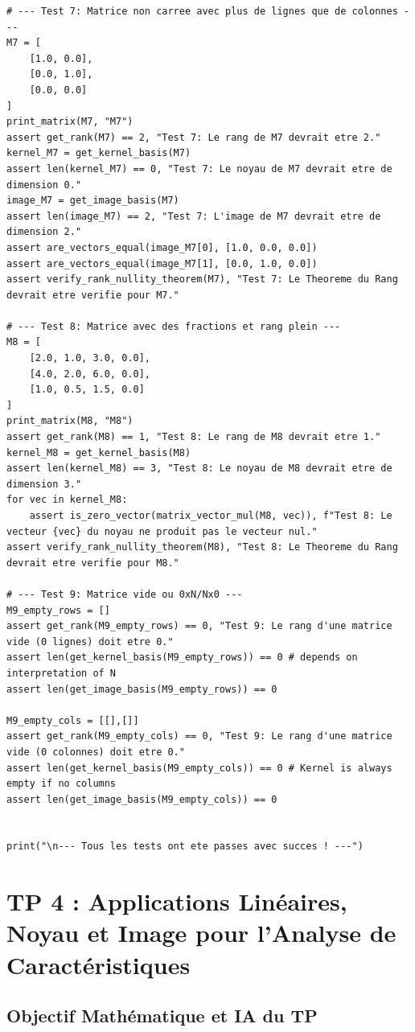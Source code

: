 \documentclass{report}
\begin{document}
\begin{verbatim}
# --- Test 7: Matrice non carree avec plus de lignes que de colonnes ---
M7 = [
    [1.0, 0.0],
    [0.0, 1.0],
    [0.0, 0.0]
]
print_matrix(M7, "M7")
assert get_rank(M7) == 2, "Test 7: Le rang de M7 devrait etre 2."
kernel_M7 = get_kernel_basis(M7)
assert len(kernel_M7) == 0, "Test 7: Le noyau de M7 devrait etre de dimension 0."
image_M7 = get_image_basis(M7)
assert len(image_M7) == 2, "Test 7: L'image de M7 devrait etre de dimension 2."
assert are_vectors_equal(image_M7[0], [1.0, 0.0, 0.0])
assert are_vectors_equal(image_M7[1], [0.0, 1.0, 0.0])
assert verify_rank_nullity_theorem(M7), "Test 7: Le Theoreme du Rang devrait etre verifie pour M7."

# --- Test 8: Matrice avec des fractions et rang plein ---
M8 = [
    [2.0, 1.0, 3.0, 0.0],
    [4.0, 2.0, 6.0, 0.0],
    [1.0, 0.5, 1.5, 0.0]
]
print_matrix(M8, "M8")
assert get_rank(M8) == 1, "Test 8: Le rang de M8 devrait etre 1."
kernel_M8 = get_kernel_basis(M8)
assert len(kernel_M8) == 3, "Test 8: Le noyau de M8 devrait etre de dimension 3."
for vec in kernel_M8:
    assert is_zero_vector(matrix_vector_mul(M8, vec)), f"Test 8: Le vecteur {vec} du noyau ne produit pas le vecteur nul."
assert verify_rank_nullity_theorem(M8), "Test 8: Le Theoreme du Rang devrait etre verifie pour M8."

# --- Test 9: Matrice vide ou 0xN/Nx0 ---
M9_empty_rows = []
assert get_rank(M9_empty_rows) == 0, "Test 9: Le rang d'une matrice vide (0 lignes) doit etre 0."
assert len(get_kernel_basis(M9_empty_rows)) == 0 # depends on interpretation of N
assert len(get_image_basis(M9_empty_rows)) == 0

M9_empty_cols = [[],[]]
assert get_rank(M9_empty_cols) == 0, "Test 9: Le rang d'une matrice vide (0 colonnes) doit etre 0."
assert len(get_kernel_basis(M9_empty_cols)) == 0 # Kernel is always empty if no columns
assert len(get_image_basis(M9_empty_cols)) == 0


print("\n--- Tous les tests ont ete passes avec succes ! ---")
\end{verbatim}

\newpage
\chapter*{TP 4 : Applications Linéaires, Noyau et Image pour l'Analyse de Caractéristiques}

\section*{Objectif Mathématique et IA du TP}
\end{document}
